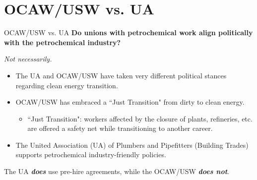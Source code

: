 \documentclass{beamer}
\begin{document}

\section{OCAW/USW vs. UA}
\begin{frame}{OCAW/USW vs. UA}
\textbf{Do unions with petrochemical work align politically with the petrochemical industry?}\newline

\emph{Not necessarily.}
	\begin{itemize}
		\item The UA and OCAW/USW have taken very different political stances regarding clean energy transition.
		\item OCAW/USW has embraced a ``Just Transition" from dirty to clean energy.
	\begin{itemize}
		\item ``Just Transition": workers affected by the closure of plants, refineries, etc. are offered a safety net while transitioning to another career.
	\end{itemize}
	\item The United Association (UA) of Plumbers and Pipefitters (Building Trades) supports petrochemical industry-friendly policies.
	\end{itemize}
The UA \textit{\textbf{does}} use pre-hire agreements, while the OCAW/USW \textbf{\textit{does not}}.
\end{frame}
\end{document}
